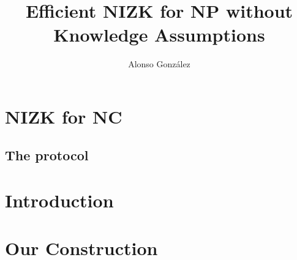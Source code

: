 \documentclass{llncs}
\author{Alonso Gonz\'alez \inst{1}}
\institute{Mi casita}
\title{Efficient NIZK for NP without Knowledge Assumptions}
\begin{document}

\maketitle
\begin{abstract}
    
\end{abstract} 

\section{NIZK for NC}

	
	
	\subsection{The protocol}
	
		

\section{Introduction}

    
        
    

        


\section{Our Construction}
    
	



\end{document}

